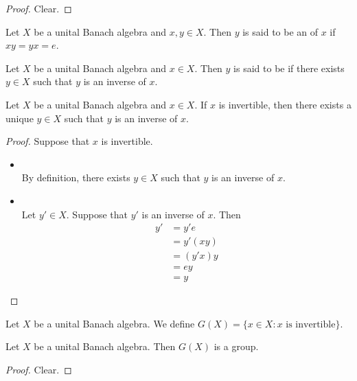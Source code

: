 \documentclass{book}
\begin{document}
\begin{proof}
	Clear.
\end{proof}

\begin{defn} \ld{}
	Let $X$ be a unital Banach algebra and $x,y \in X$. Then $y$ is said to be an 
	 of $x$ if $xy = yx = e$.
\end{defn}

\begin{defn} \ld{}
	Let $X$ be a unital Banach algebra and $x \in X$. Then $y$ is said to be 
	 if there exists $y \in X$ such that $y$ is an inverse of $x$.
\end{defn}

\begin{ex} \lex{}
	Let $X$ be a unital Banach algebra and $x \in X$. If $x$ is invertible, then there exists a unique $y \in X$ such that $y$ is an inverse of $x$.
\end{ex}

\begin{proof}
	Suppose that $x$ is invertible.
	\begin{itemize}
		\item {} \\
		By definition, there exists $y \in X$ such that $y$ is an inverse of $x$.
		\item {}\\
		Let $y' \in X$. Suppose that $y'$ is an inverse of $x$. Then 
		\begin{align*}
			y'
			& = y'e \\
			& = y'(xy) \\
			& = (y'x)y \\
			& = ey \\
			& = y
		\end{align*}
	\end{itemize}
\end{proof}

\begin{defn} \ld{}
	Let $X$ be a unital Banach algebra. We define $G(X) = \{x \in X: x \text{ is invertible}\}$.
\end{defn}

\begin{ex} \lex{}
	Let $X$ be a unital Banach algebra. Then $G(X)$ is a group.  
\end{ex}

\begin{proof}
	Clear.
\end{proof}
\end{document}
